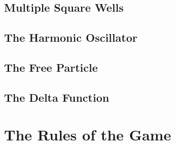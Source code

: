 \documentclass[12pt,letterpaper]{book}
\begin{document}

\section{Multiple Square Wells}



\section{The Harmonic Oscillator}



\section{The Free Particle}



\section{The Delta Function}





\chapter{The Rules of the Game}





\end{document}

